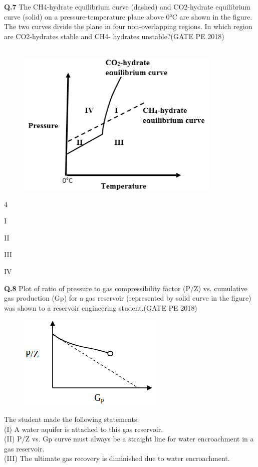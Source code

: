 \documentclass[15pt,a4paper]{article}
\begin{document}
\pagebreak

\noindent
\textbf{Q.7} The CH4-hydrate equilibrium curve (dashed) and CO2-hydrate equilibrium curve (solid) on
a pressure-temperature plane above 0°C are shown in the figure. The two curves divide the
plane in four non-overlapping regions. In which region are CO2-hydrates stable and CH4-
hydrates unstable?\hfill(GATE PE 2018)\\\\

\begin{figure}[h!]
  \centering
  \includegraphics[width=0.4\columnwidth]{pic3.png} 
\end{figure}

	\begin{enumerate}
\end{enumerate}


\noindent
\textbf{Q.8} Plot of ratio of pressure to gas compressibility factor (P/Z) vs. cumulative gas production
(Gp) for a gas reservoir (represented by solid curve in the figure) was shown to a reservoir
engineering student.\hfill(GATE PE 2018)

\begin{figure}[h!]
  \centering
  \includegraphics[width=0.4\columnwidth]{pic4.png} 
\end{figure}
\noindent
The student made the following statements:\\
(I) A water aquifer is attached to this gas reservoir.\\
(II) P/Z vs. Gp curve must always be a straight line for water encroachment in a gas
reservoir.\\
(III) The ultimate gas recovery is diminished due to water encroachment.\\
\end{document}
